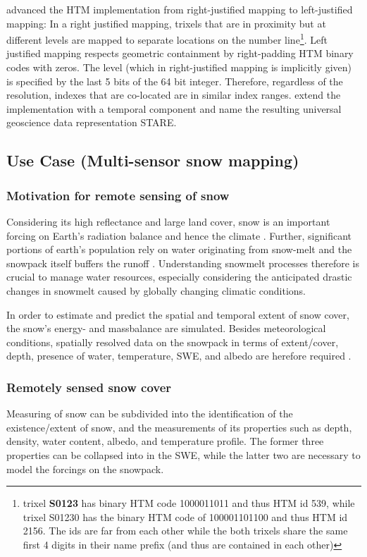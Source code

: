 \documentclass[letterpaper, parskip=half]{scrartcl}
\begin{document}
\cite{Rilee2016} advanced the HTM implementation from right-justified mapping to left-justified mapping:
In a right justified mapping, trixels that are in proximity but at different levels are mapped to separate locations on the number line\footnote{trixel \textbf{S0123} has binary HTM code 1000011011 and thus HTM id 539, while trixel S01230 has the binary HTM code of 100001101100 and thus HTM id 2156. The ids are far from each other while the both trixels share the same first 4 digits in their name prefix (and thus are contained in each other)}.
Left justified mapping respects geometric containment by right-padding HTM binary codes with zeros.
The level (which in right-justified mapping is implicitly given) is specified by the last 5 bits of the 64 bit integer. Therefore, regardless of the resolution, indexes that are co-located are in similar index ranges.
\cite{Kuo2017} extend the implementation with a temporal component and name the resulting universal geoscience data representation \gls{STARE}.

\newpage

\subsection{Use Case (Multi-sensor snow mapping)}

    
\subsubsection{Motivation for remote sensing of snow}
Considering its high reflectance and large land cover, snow is an important forcing on Earth's radiation balance and hence the climate \citep{Durand2017}.
Further, significant portions of earth's population rely on water originating from snow-melt \citep{Barnett2005, Durand2017} and the snowpack itself buffers the runoff \citep{Lettenmaier2015}.
Understanding snowmelt processes therefore is crucial to manage water resources, especially considering the anticipated drastic changes in snowmelt caused by globally changing climatic conditions. 

In order to estimate and predict the spatial and temporal extent of snow cover, the snow's energy- and massbalance are simulated. Besides meteorological conditions, spatially resolved data on the snowpack in terms of extent/cover, depth, presence of water, temperature, \gls{SWE}, and albedo are herefore required \citep{Dozier2004}.


\subsubsection{Remotely sensed snow cover}
Measuring of snow can be subdivided into the identification of the existence/extent of snow, and the measurements of its properties such as depth, density, water content, albedo, and temperature profile. The former three properties can be collapsed into in the \gls{SWE}, while the latter two are necessary to model the forcings on the snowpack.
\end{document}
